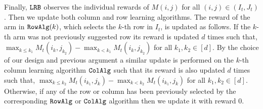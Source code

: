 

Finally, ${\tt LRB}$ observes the individual rewards of $M(i,j)$ for all $(i,j)\in (I_t, J_t)$. Then we update both column and row learning algorithms. The reward of the arm in ${\tt RowAlg}(k)$, which selects the $k$-th row in $I_t$, is updated as follows. If the $k$-th arm was not previously suggested row its reward is updated $d$ times such that, $\max_{k \leq k_1} M_t(i_k, j_{k_2}) - \max_{k < k_1} M_t(i_k, j_{k_2})$ for all $k_1,k_2 \in [d]$. By the choice of our design and previous argument a similar update is performed on the $k$-th column learning algorithm ${\tt ColAlg}$ such that its reward is also updated $d$ times such that, $\max_{k \leq k_2} M_t(i_{k_1}, j_k)  - \max_{k < k_2} M_t(i_{k_1}, j_k)$ for all $k_1,k_2 \in [d]$. Otherwise, if any of the row or column has been previously selected by the corresponding ${\tt RowAlg}$ or ${\tt ColAlg}$ algorithm then we update it with reward $0$. 





